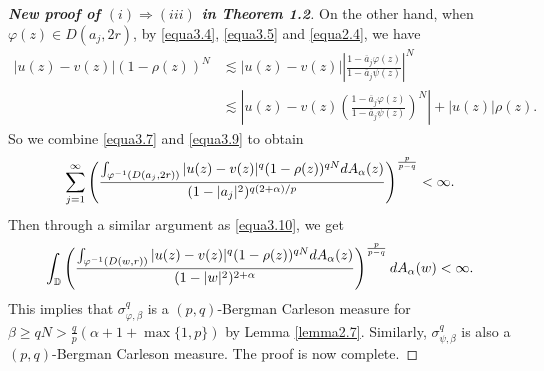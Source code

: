\documentclass[10pt,a4paper]{amsart}
\begin{document}
\begin{proof}[{\bf New proof of $(i)\Rightarrow (iii)$ in Theorem 1.2}]
On the other hand, when $\varphi(z)\in D(a_j,2r)$, by \eqref{equa3.4}, \eqref{equa3.5} and \eqref{equa2.4}, we have
\begin{equation*}
\begin{split}
|u(z)-v(z)|(1-\rho(z))^N&\lesssim |u(z)-v(z)|\left|\frac{1-\overline{a}_j\varphi(z)}{1-\overline{a}_j\psi(z)}\right|^N\\
&\lesssim \left|u(z)-v(z)\left(\frac{1-\overline{a}_j\varphi(z)}{1-\overline{a}_j\psi(z)}\right)^N\right|+|u(z)|\rho(z).
\end{split}
\end{equation*}
So we combine \eqref{equa3.7} and \eqref{equa3.9} to obtain
\begin{equation*}
\sum_{j=1}^{\infty}\left(\frac{\int_{\varphi^{-1}(D(a_j,2r))}|u(z)-v(z)|^q(1-\rho(z))^{qN}{\rm d}A_{\alpha}(z)}{(1-|a_j|^2)^{q(2+\alpha)/p}}\right)^{\frac{p}{p-q}}<\infty.
\end{equation*}
Then through a similar argument as \eqref{equa3.10}, we get
\begin{equation*}
\int_{\mathbb{D}}\left(\frac{\int_{\varphi^{-1}(D(w,r))}|u(z)-v(z)|^q(1-\rho(z))^{qN}{\rm d}A_{\alpha}(z)}{(1-|w|^2)^{2+\alpha}}\right)^{\frac{p}{p-q}}{\rm d}A_{\alpha}(w)<\infty.
\end{equation*}
This implies that $\sigma_{\varphi,\beta}^q$ is a $(p,q)$-Bergman Carleson measure for $\beta\geq qN>\frac{q}{p}(\alpha+1+\max\{1,p\})$ by Lemma \ref{lemma2.7}. Similarly, $\sigma_{\psi,\beta}^q$ is also a $(p,q)$-Bergman Carleson measure. The proof is now complete.
\end{proof}
\end{document}
